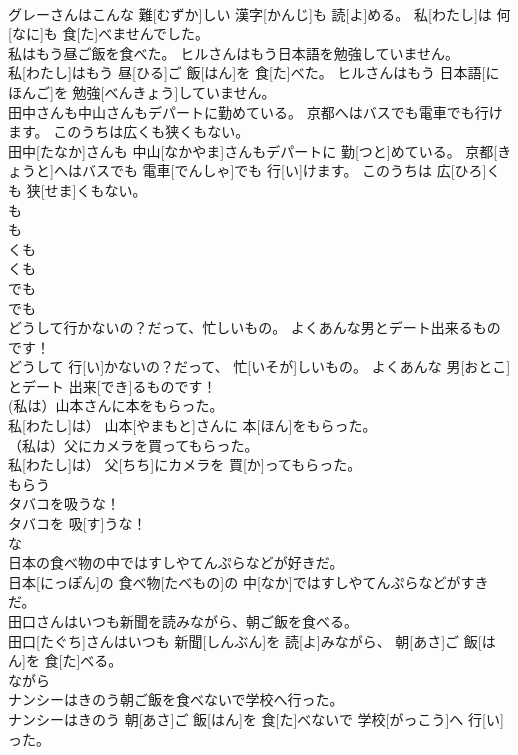 \documentclass[8pt]{extreport}
\begin{document}
\begin{CJK}{UTF8}{min}
\\	グレーさんはこんな 難[むずか]しい 漢字[かんじ]も 読[よ]める。 私[わたし]は 何[なに]も 食[た]べませんでした。	
\\	私はもう昼ご飯を食べた。 ヒルさんはもう日本語を勉強していません。	
\\	私[わたし]はもう 昼[ひる]ご 飯[はん]を 食[た]べた。 ヒルさんはもう 日本語[にほんご]を 勉強[べんきょう]していません。	
\\	田中さんも中山さんもデパートに勤めている。 京都へはバスでも電車でも行けます。 このうちは広くも狭くもない。	
\\	田中[たなか]さんも 中山[なかやま]さんもデパートに 勤[つと]めている。 京都[きょうと]へはバスでも 電車[でんしゃ]でも 行[い]けます。 このうちは 広[ひろ]くも 狭[せま]くもない。	
\\	も　
\\	も 
\\	くも　 
\\	くも 
\\	でも　
\\	でも	
\\	どうして行かないの？だって、忙しいもの。 よくあんな男とデート出来るものです！	
\\	どうして 行[い]かないの？だって、 忙[いそが]しいもの。 よくあんな 男[おとこ]とデート 出来[でき]るものです！	
\\	(私は）山本さんに本をもらった。	
\\	私[わたし]は） 山本[やまもと]さんに 本[ほん]をもらった。	
\\	（私は）父にカメラを買ってもらった。	
\\	私[わたし]は） 父[ちち]にカメラを 買[か]ってもらった。	
\\	もらう	
\\	タバコを吸うな！	
\\	タバコを 吸[す]うな！	
\\	な	
\\	日本の食べ物の中ではすしやてんぷらなどが好きだ。	
\\	日本[にっぽん]の 食べ物[たべもの]の 中[なか]ではすしやてんぷらなどがすきだ。	
\\	田口さんはいつも新聞を読みながら、朝ご飯を食べる。	
\\	田口[たぐち]さんはいつも 新聞[しんぶん]を 読[よ]みながら、 朝[あさ]ご 飯[はん]を 食[た]べる。	
\\	ながら	
\\	ナンシーはきのう朝ご飯を食べないで学校へ行った。	
\\	ナンシーはきのう 朝[あさ]ご 飯[はん]を 食[た]べないで 学校[がっこう]へ 行[い]った。	

\end{CJK}
\end{document}

